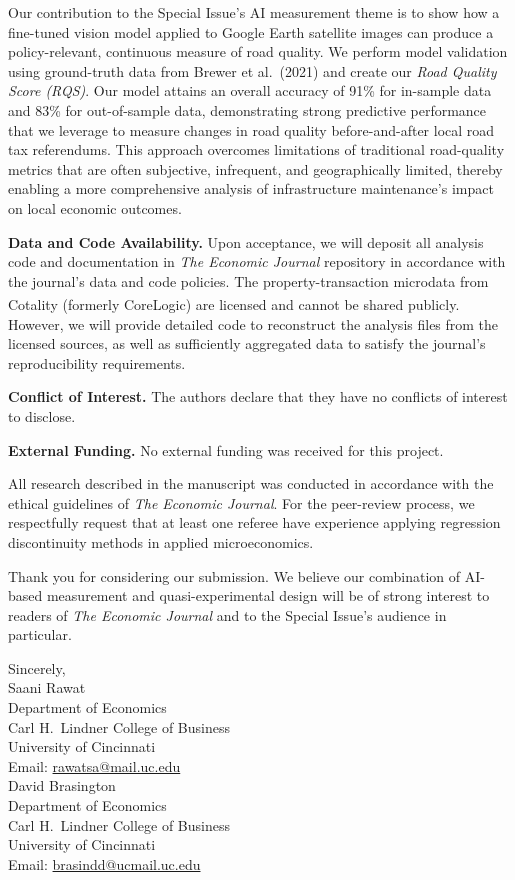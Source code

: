 \documentclass[12pt]{article}
\begin{document}
Our contribution to the Special Issue's AI measurement theme is to show how a fine-tuned vision model applied to Google Earth satellite images can produce a policy-relevant, continuous measure of road quality. We perform model validation using ground-truth data from Brewer et al.\ (2021) and create our \emph{Road Quality Score (RQS)}. Our model attains an overall accuracy of 91\% for in-sample data and 83\% for out-of-sample data, demonstrating strong predictive performance that we leverage to measure changes in road quality before-and-after local road tax referendums. This approach overcomes limitations of traditional road-quality metrics that are often subjective, infrequent, and geographically limited, thereby enabling a more comprehensive analysis of infrastructure maintenance's impact on local economic outcomes.


\textbf{Data and Code Availability.} Upon acceptance, we will deposit all analysis code and documentation in \emph{The Economic Journal} repository in accordance with the journal's data and code policies. The property-transaction microdata from Cotality (formerly CoreLogic\textsuperscript{\textregistered}) are licensed and cannot be shared publicly. However, we will provide detailed code to reconstruct the analysis files from the licensed sources, as well as sufficiently aggregated data to satisfy the journal's reproducibility requirements.

\textbf{Conflict of Interest.} The authors declare that they have no conflicts of interest to disclose.

\textbf{External Funding.} No external funding was received for this project.

All research described in the manuscript was conducted in accordance with the ethical guidelines of \emph{The Economic Journal}. For the peer-review process, we respectfully request that at least one referee have experience applying regression discontinuity methods in applied microeconomics.

Thank you for considering our submission. We believe our combination of AI-based measurement and quasi-experimental design will be of strong interest to readers of \emph{The Economic Journal} and to the Special Issue's audience in particular.

\vspace{1.5em}

Sincerely, \\[0.75em]

Saani Rawat \\
Department of Economics\\ 
Carl H.\ Lindner College of Business \\
University of Cincinnati \\
Email: \href{mailto:rawatsa@mail.uc.edu}{rawatsa@mail.uc.edu} \\[1em]

David Brasington \\
Department of Economics\\ 
Carl H.\ Lindner College of Business \\
University of Cincinnati \\
Email: \href{mailto:brasindd@ucmail.uc.edu}{brasindd@ucmail.uc.edu}
\end{document}
